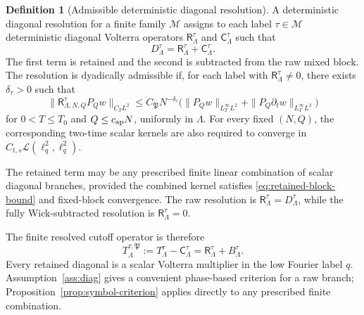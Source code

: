 \documentclass[11pt,reqno]{amsart}
\numberwithin{equation}{section}
\theoremstyle{plain}
\theoremstyle{definition}
\newtheorem{definition}[theorem]{Definition}
\newcommand{\cL}{\mathcal L}
\newcommand{\cM}{\mathcal M}
\newcommand{\Ret}{\mathsf R}
\newcommand{\Ctr}{\mathsf C}
\begin{document}
\begin{definition}[Admissible deterministic diagonal resolution]\label{def:contraction-resolution}
A deterministic diagonal resolution for a finite family \(\cM\) assigns to
each label \(\tau\in\cM\) deterministic diagonal Volterra operators
\(\Ret^\tau_\Lambda\) and \(\Ctr^\tau_\Lambda\) such that
\begin{equation}\label{eq:resolution}
        D^\tau_\Lambda=\Ret^\tau_\Lambda+\Ctr^\tau_\Lambda .
\end{equation}
The first term is retained and the second is subtracted from the raw mixed
block.  The resolution is dyadically admissible if, for each label with
\(\Ret^\tau_\Lambda\ne0\), there exists \(\delta_\tau>0\) such that
\begin{equation}\label{eq:retained-block-bound}
        \|\Ret^\tau_{\Lambda,N,Q}P_Qw\|_{C_TL^2}
        \le C_{\mathfrak P}N^{-\delta_\tau}
        \bigl(\|P_Qw\|_{L_T^\infty L^2}
        +\|P_Q\partial_tw\|_{L_T^\infty L^2}\bigr)
\end{equation}
for \(0<T\le T_0\) and \(Q\le c_{\rm ap}N\), uniformly in \(\Lambda\).
For every fixed \((N,Q)\), the corresponding two-time scalar kernels are
also required to converge in
\(C_{t,s}\cL(\ell_q^2,\ell_q^2)\).

The retained term may be any prescribed finite linear combination of scalar
diagonal branches, provided the combined kernel satisfies
\eqref{eq:retained-block-bound} and fixed-block convergence.  The raw
resolution is \(\Ret^\tau_\Lambda=D^\tau_\Lambda\), while the fully
Wick-subtracted resolution is \(\Ret^\tau_\Lambda=0\).
\end{definition}

The finite resolved cutoff operator is therefore
\begin{equation}\label{eq:resolved-cutoff}
        T^{\tau,\mathfrak P}_\Lambda
        :=T^\tau_\Lambda-\Ctr^\tau_\Lambda
        =\Ret^\tau_\Lambda+B^\tau_\Lambda .
\end{equation}
Every retained diagonal is a scalar Volterra multiplier in the low Fourier
label \(q\).  Assumption~\ref{ass:diag} gives a convenient phase-based
criterion for a raw branch; Proposition~\ref{prop:symbol-criterion} applies
directly to any prescribed finite combination.
\end{document}
